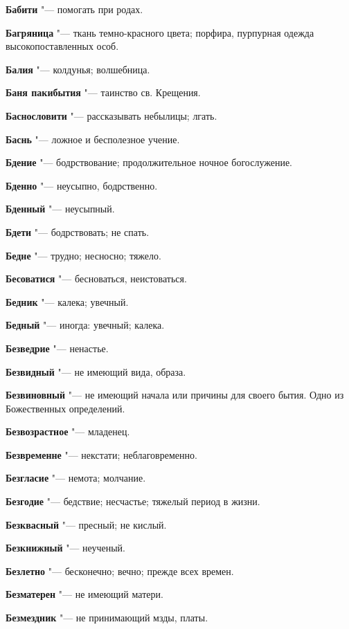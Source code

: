 \begin{mymulticols}
\noindent\textbf{Бабити} "--- помогать при родах. 

\noindent\textbf{Багряница} "--- ткань темно-красного цвета; порфира, пурпурная одежда высокопоставленных особ. 

\noindent\textbf{Балия} "--- колдунья; волшебница. 

\noindent\textbf{Баня пакибытия} "--- таинство св. Крещения. 

\noindent\textbf{Баснословити} "--- рассказывать небылицы; лгать. 

\noindent\textbf{Баснь} "--- ложное и бесполезное учение. 

\noindent\textbf{Бдение} "--- бодрствование; продолжительное ночное богослужение. 

\noindent\textbf{Бденно} "--- неусыпно, бодрственно. 

\noindent\textbf{Бденный} "--- неусыпный. 

\noindent\textbf{Бдети} "--- бодрствовать; не спать. 

\noindent\textbf{Бедне} "--- трудно; несносно; тяжело. 

\noindent\textbf{Бесоватися} "--- бесноваться, неистоваться. 

\noindent\textbf{Бедник} "--- калека; увечный. 

\noindent\textbf{Бедный} "--- иногда: увечный; калека. 

\noindent\textbf{Безведрие} "--- ненастье. 

\noindent\textbf{Безвидный} "--- не имеющий вида, образа. 

\noindent\textbf{Безвиновный} "--- не имеющий начала или причины для своего бытия. Одно из Божественных определений. 

\noindent\textbf{Безвозрастное} "--- младенец. 

\noindent\textbf{Безвременне} "--- некстати; неблаговременно. 

\noindent\textbf{Безгласие} "--- немота; молчание. 

\noindent\textbf{Безгодие} "--- бедствие; несчастье; тяжелый период в жизни. 

\noindent\textbf{Безквасный} "--- пресный; не кислый. 

\noindent\textbf{Безкнижный} "--- неученый. 

\noindent\textbf{Безлетно} "--- бесконечно; вечно; прежде всех времен. 

\noindent\textbf{Безматерен} "--- не имеющий матери. 

\noindent\textbf{Безмездник} "--- не принимающий мзды, платы. 


\end{mymulticols}
